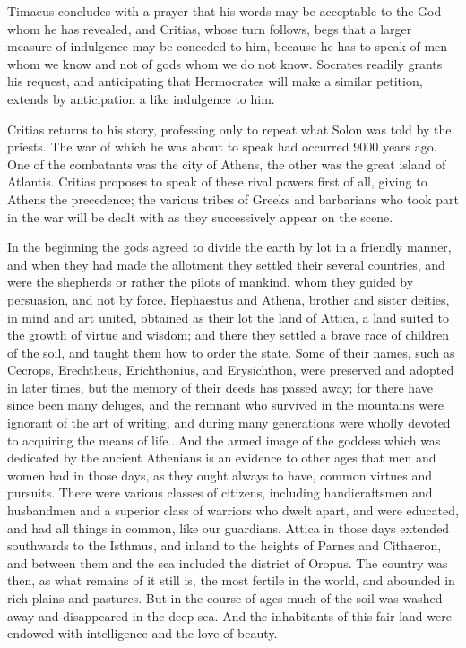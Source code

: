 \documentclass[11pt,letter]{article}
\begin{document}
\par  Timaeus concludes with a prayer that his words may be acceptable to the God whom he has revealed, and Critias, whose turn follows, begs that a larger measure of indulgence may be conceded to him, because he has to speak of men whom we know and not of gods whom we do not know. Socrates readily grants his request, and anticipating that Hermocrates will make a similar petition, extends by anticipation a like indulgence to him.

\par  Critias returns to his story, professing only to repeat what Solon was told by the priests. The war of which he was about to speak had occurred 9000 years ago. One of the combatants was the city of Athens, the other was the great island of Atlantis. Critias proposes to speak of these rival powers first of all, giving to Athens the precedence; the various tribes of Greeks and barbarians who took part in the war will be dealt with as they successively appear on the scene.

\par  In the beginning the gods agreed to divide the earth by lot in a friendly manner, and when they had made the allotment they settled their several countries, and were the shepherds or rather the pilots of mankind, whom they guided by persuasion, and not by force. Hephaestus and Athena, brother and sister deities, in mind and art united, obtained as their lot the land of Attica, a land suited to the growth of virtue and wisdom; and there they settled a brave race of children of the soil, and taught them how to order the state. Some of their names, such as Cecrops, Erechtheus, Erichthonius, and Erysichthon, were preserved and adopted in later times, but the memory of their deeds has passed away; for there have since been many deluges, and the remnant who survived in the mountains were ignorant of the art of writing, and during many generations were wholly devoted to acquiring the means of life...And the armed image of the goddess which was dedicated by the ancient Athenians is an evidence to other ages that men and women had in those days, as they ought always to have, common virtues and pursuits. There were various classes of citizens, including handicraftsmen and husbandmen and a superior class of warriors who dwelt apart, and were educated, and had all things in common, like our guardians. Attica in those days extended southwards to the Isthmus, and inland to the heights of Parnes and Cithaeron, and between them and the sea included the district of Oropus. The country was then, as what remains of it still is, the most fertile in the world, and abounded in rich plains and pastures. But in the course of ages much of the soil was washed away and disappeared in the deep sea. And the inhabitants of this fair land were endowed with intelligence and the love of beauty.
\end{document}
